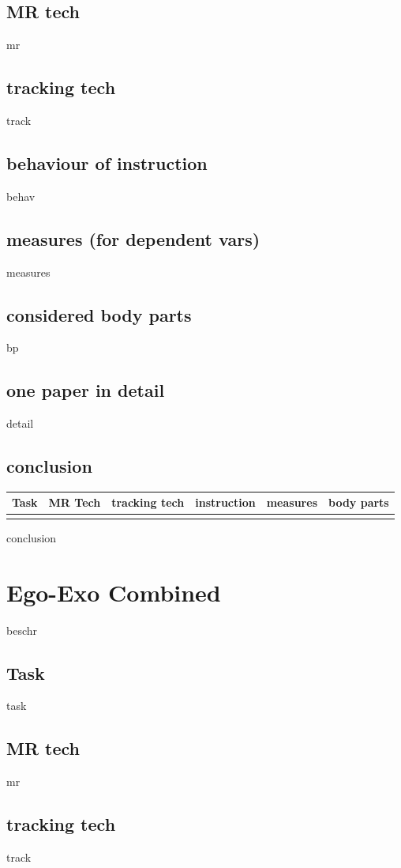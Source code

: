 \subsection{MR tech}
mr
\subsection{tracking tech}
track
\subsection{behaviour of instruction}
behav
\subsection{measures (for dependent vars)}
measures
\subsection{considered body parts}
bp
\subsection{one paper in detail}
detail
\subsection{conclusion}
\begin{table}[]
	\begin{tabular}{|l|l|l|l|l|l|}
		\hline
		Task & MR Tech & tracking tech & instruction & measures & body parts  \\ \hline
		&  &  &  &  &  \\ \hline
	\end{tabular}
\end{table}
conclusion

\section{Ego-Exo Combined}
beschr
\subsection{Task}
task
\subsection{MR tech}
mr
\subsection{tracking tech}
track
